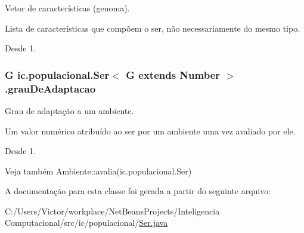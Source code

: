 Vetor de características (genoma). 

Lista de características que compõem o ser, não necessariamente do mesmo tipo.

\begin{DoxySince}{Desde}
1. 
\end{DoxySince}
\hypertarget{classic_1_1populacional_1_1_ser_3_01_g_01extends_01_number_01_4_aba308e4d1affe1f03d74adb5257d269c}{
\subsubsection[{grau\-De\-Adaptacao}]{\setlength{\rightskip}{0pt plus 5cm}G ic.\-populacional.\-Ser$<$ G extends Number $>$.grau\-De\-Adaptacao\hspace{0.3cm}{\ttfamily [protected]}}}\label{classic_1_1populacional_1_1_ser_3_01_g_01extends_01_number_01_4_aba308e4d1affe1f03d74adb5257d269c}


Grau de adaptação a um ambiente. 

Um valor numérico atribuído ao ser por um ambiente uma vez avaliado por ele.

\begin{DoxySince}{Desde}
1.
\end{DoxySince}
\begin{DoxySeeAlso}{Veja também}
Ambiente\-::avalia(ic.\-populacional.\-Ser) 
\end{DoxySeeAlso}


A documentação para esta classe foi gerada a partir do seguinte arquivo\-:\begin{DoxyCompactItemize}
\item 
C\-:/\-Users/\-Victor/workplace/\-Net\-Beans\-Projects/\-Inteligencia Computacional/src/ic/populacional/\hyperlink{_ser_8java}{Ser.\-java}\end{DoxyCompactItemize}

